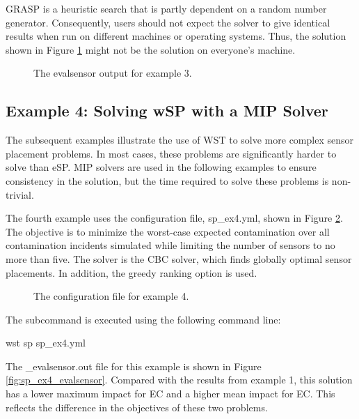 GRASP is a heuristic search that is partly dependent on a random
number generator. Consequently, users should not expect the solver
to give identical results when run on different machines or operating
systems. Thus, the solution shown in Figure \ref{fig:sp_ex3_evalsensor}
might not be the solution on everyone's machine.

\begin{figure}[h]
  \caption{The evalsensor output for  example 3.}
  \label{fig:sp_ex3_evalsensor}
\end{figure}


\FloatBarrier 
\subsection{Example 4: Solving wSP with a MIP Solver}
\label{sp_example4}
The subsequent examples illustrate the use of WST to solve more
complex sensor placement problems. In most cases, these problems are
significantly harder to solve than eSP. MIP solvers are used in the following 
examples to ensure consistency in the solution, but the time required to solve 
these problems is non-trivial.

The fourth example uses the configuration file, sp\_ex4.yml, shown
in Figure \ref{fig:sp_ex4}. The objective is to minimize the
worst-case expected contamination over all contamination incidents
simulated while limiting the number of sensors to no more than
five. The solver is the CBC solver, which finds globally optimal 
sensor placements. In addition, the greedy ranking option is used.

\begin{figure}[h]
  \caption{The  configuration file for example 4.}
  \label{fig:sp_ex4}
\end{figure}

The  subcommand is executed using the following command line:

\begin{unknownListing}
wst sp sp_ex4.yml
\end{unknownListing}

The {\outputprefix}\_evalsensor.out file for this example is shown in Figure
\ref{fig:sp_ex4_evalsensor}. Compared with the results from example 1, this
solution has a lower maximum impact for EC and a higher mean impact
for EC. This reflects the difference in the objectives of these two
problems.

